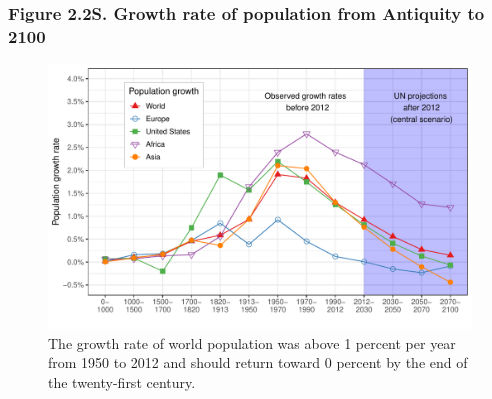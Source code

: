 \documentclass[t]{beamer}\usepackage[]{graphicx}\usepackage[]{color}
\newenvironment{knitrout}{}{} %
\begin{document}
\begin{frame}[label=Figure_2_2S]
\frametitle{Figure 2.2S. Growth rate of population from Antiquity to 2100}
\begin{figure}[t]
\begin{minipage}[b]{\textwidth}
\centering
\begin{knitrout}\footnotesize
{}\color{fgcolor}

{\centering \includegraphics[width=1\linewidth]{figures/color/Figure_2_2S} 

}



\end{knitrout}
\caption{The growth rate of world population was above 1 percent per year from 1950 to 2012 and should return toward 0 percent by the end of the twenty-first century.}
\end{minipage}
\end{figure}
\end{frame}
\end{document}
